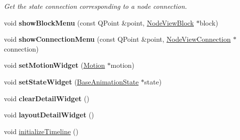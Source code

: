 \begin{Indent}
\begin{DoxyCompactItemize}
\begin{DoxyCompactList}\small\item\em Get the state connection corresponding to a node connection. \end{DoxyCompactList}\item 
\mbox{\label{classrev_1_1_view_1_1_animation_node_widget_a68f01baa48e98b3f2136be13562e07a7}} 
void {\bfseries show\+Block\+Menu} (const Q\+Point \&point, \mbox{\hyperlink{classrev_1_1_view_1_1_node_view_block}{Node\+View\+Block}} $\ast$block)
\item 
\mbox{\label{classrev_1_1_view_1_1_animation_node_widget_a5d4671fca867d082235fcb59eac7eda7}} 
void {\bfseries show\+Connection\+Menu} (const Q\+Point \&point, \mbox{\hyperlink{classrev_1_1_view_1_1_node_view_connection}{Node\+View\+Connection}} $\ast$connection)
\item 
\mbox{\label{classrev_1_1_view_1_1_animation_node_widget_a94cc05e0aa1e0e4df25ad095945931bc}} 
void {\bfseries set\+Motion\+Widget} (\mbox{\hyperlink{classrev_1_1_motion}{Motion}} $\ast$motion)
\item 
\mbox{\label{classrev_1_1_view_1_1_animation_node_widget_ab5e6d4cc629736cc16e6413ade7e2d45}} 
void {\bfseries set\+State\+Widget} (\mbox{\hyperlink{classrev_1_1_base_animation_state}{Base\+Animation\+State}} $\ast$state)
\item 
\mbox{\label{classrev_1_1_view_1_1_animation_node_widget_a47283c0ee89ab1388559f7902f53d551}} 
void {\bfseries clear\+Detail\+Widget} ()
\item 
\mbox{\label{classrev_1_1_view_1_1_animation_node_widget_a8b7de0f8cb68d324697501d31cb3dbdf}} 
void {\bfseries layout\+Detail\+Widget} ()
\item 
\mbox{\label{classrev_1_1_view_1_1_animation_node_widget_a740cad50ac56cd64b91fd925fc5b6bbe}} 
void \mbox{\hyperlink{classrev_1_1_view_1_1_animation_node_widget_a740cad50ac56cd64b91fd925fc5b6bbe}{initialize\+Timeline}} ()

\end{DoxyCompactItemize}
\end{Indent}
